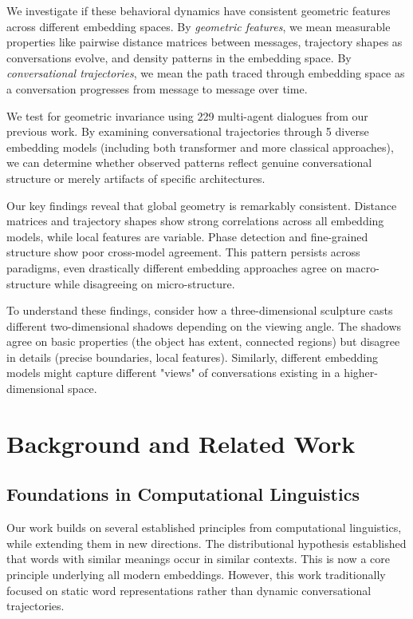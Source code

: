 \documentclass[11pt,letterpaper]{article}
\newcommand{\totalConversations}{229}
\newcommand{\numEmbeddingModels}{5}
\begin{document}
We investigate if these behavioral dynamics have consistent geometric features across different embedding spaces. By \textit{geometric features}, we mean measurable properties like pairwise distance matrices between messages, trajectory shapes as conversations evolve, and density patterns in the embedding space. By \textit{conversational trajectories}, we mean the path traced through embedding space as a conversation progresses from message to message over time.

We test for geometric invariance using \totalConversations{} multi-agent dialogues from our previous work. By examining conversational trajectories through \numEmbeddingModels{} diverse embedding models (including both transformer and more classical approaches), we can determine whether observed patterns reflect genuine conversational structure or merely artifacts of specific architectures.

Our key findings reveal that global geometry is remarkably consistent. Distance matrices and trajectory shapes show strong correlations across all embedding models, while local features are variable. Phase detection and fine-grained structure show poor cross-model agreement. This pattern persists across paradigms, even drastically different embedding approaches agree on macro-structure while disagreeing on micro-structure.

To understand these findings, consider how a three-dimensional sculpture casts different two-dimensional shadows depending on the viewing angle. The shadows agree on basic properties (the object has extent, connected regions) but disagree in details (precise boundaries, local features). Similarly, different embedding models might capture different "views" of conversations existing in a higher-dimensional space.

\section{Background and Related Work}

\subsection{Foundations in Computational Linguistics}

Our work builds on several established principles from computational linguistics, while extending them in new directions. The distributional hypothesis \citep{harris1954distributional, firth1957papers} established that words with similar meanings occur in similar contexts. This is now a core principle underlying all modern embeddings. However, this work traditionally focused on static word representations rather than dynamic conversational trajectories.
\end{document}
